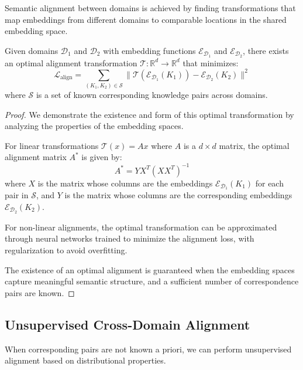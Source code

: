 Semantic alignment between domains is achieved by finding transformations that map embeddings from different domains to comparable locations in the shared embedding space.

\begin{theorem}
Given domains $\mathcal{D}_1$ and $\mathcal{D}_2$ with embedding functions $\mathcal{E}_{\mathcal{D}_1}$ and $\mathcal{E}_{\mathcal{D}_2}$, there exists an optimal alignment transformation $\mathcal{T}: \mathbb{R}^d \rightarrow \mathbb{R}^d$ that minimizes:
\begin{equation}
\mathcal{L}_{\text{align}} = \sum_{(K_1, K_2) \in \mathcal{S}} \|\mathcal{T}(\mathcal{E}_{\mathcal{D}_1}(K_1)) - \mathcal{E}_{\mathcal{D}_2}(K_2)\|^2
\end{equation}
where $\mathcal{S}$ is a set of known corresponding knowledge pairs across domains.
\end{theorem}

\begin{proof}
We demonstrate the existence and form of this optimal transformation by analyzing the properties of the embedding spaces.

For linear transformations $\mathcal{T}(x) = Ax$ where $A$ is a $d \times d$ matrix, the optimal alignment matrix $A^*$ is given by:
\begin{equation}
A^* = YX^T(XX^T)^{-1}
\end{equation}
where $X$ is the matrix whose columns are the embeddings $\mathcal{E}_{\mathcal{D}_1}(K_1)$ for each pair in $\mathcal{S}$, and $Y$ is the matrix whose columns are the corresponding embeddings $\mathcal{E}_{\mathcal{D}_2}(K_2)$.

For non-linear alignments, the optimal transformation can be approximated through neural networks trained to minimize the alignment loss, with regularization to avoid overfitting.

The existence of an optimal alignment is guaranteed when the embedding spaces capture meaningful semantic structure, and a sufficient number of correspondence pairs are known.
\end{proof}

\subsection{Unsupervised Cross-Domain Alignment}

When corresponding pairs are not known a priori, we can perform unsupervised alignment based on distributional properties.

